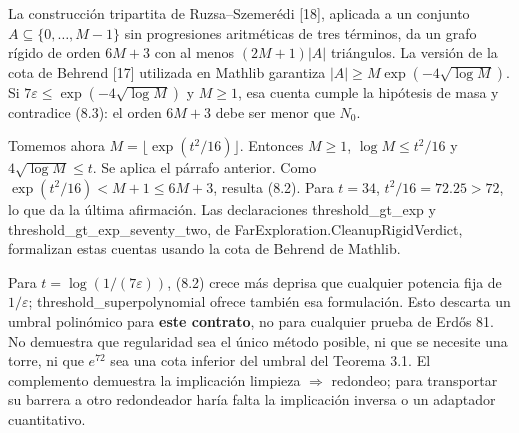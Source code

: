 \documentclass[spanish,11pt,a4paper]{article}
\begin{document}
La construcción tripartita de Ruzsa--Szemerédi {[}18{]}, aplicada a un conjunto \(A\subseteq\{0,\ldots,M-1\}\) sin progresiones aritméticas de tres términos, da un grafo rígido de orden \(6M+3\) con al menos \((2M+1)|A|\) triángulos. La versión de la cota de Behrend {[}17{]} utilizada en Mathlib garantiza \(|A|\ge M\exp(-4\sqrt{\log M})\). Si \(7\varepsilon\le\exp(-4\sqrt{\log M})\) y \(M\ge1\), esa cuenta cumple la hipótesis de masa y contradice (8.3): el orden \(6M+3\) debe ser menor que \(N_0\).

Tomemos ahora \(M=\lfloor\exp(t^2/16)\rfloor\). Entonces \(M\ge1\), \(\log M\le t^2/16\) y \(4\sqrt{\log M}\le t\). Se aplica el párrafo anterior. Como \(\exp(t^2/16)<M+1\le6M+3\), resulta (8.2). Para \(t=34\), \(t^2/16=72.25>72\), lo que da la última afirmación. Las declaraciones {\ttfamily\small threshold\_\discretionary{\hbox{\ensuremath{\hookrightarrow}}}{}{}gt\_\discretionary{\hbox{\ensuremath{\hookrightarrow}}}{}{}exp} y {\ttfamily\small threshold\_\discretionary{\hbox{\ensuremath{\hookrightarrow}}}{}{}gt\_\discretionary{\hbox{\ensuremath{\hookrightarrow}}}{}{}exp\_\discretionary{\hbox{\ensuremath{\hookrightarrow}}}{}{}seventy\_\discretionary{\hbox{\ensuremath{\hookrightarrow}}}{}{}two}, de {\ttfamily\small FarExplorati\discretionary{\hbox{\ensuremath{\hookrightarrow}}}{}{}on.\discretionary{\hbox{\ensuremath{\hookrightarrow}}}{}{}CleanupRigid\discretionary{\hbox{\ensuremath{\hookrightarrow}}}{}{}Verdict}, formalizan estas cuentas usando la cota de Behrend de Mathlib.

Para \(t=\log(1/(7\varepsilon))\), (8.2) crece más deprisa que cualquier potencia fija de \(1/\varepsilon\); {\ttfamily\small threshold\_\discretionary{\hbox{\ensuremath{\hookrightarrow}}}{}{}superpolynom\discretionary{\hbox{\ensuremath{\hookrightarrow}}}{}{}ial} ofrece también esa formulación. Esto descarta un umbral polinómico para \textbf{este contrato}, no para cualquier prueba de Erdős 81. No demuestra que regularidad sea el único método posible, ni que se necesite una torre, ni que \(e^{72}\) sea una cota inferior del umbral del Teorema 3.1. El complemento demuestra la implicación limpieza \(\Rightarrow\) redondeo; para transportar su barrera a otro redondeador haría falta la implicación inversa o un adaptador cuantitativo.
\end{document}
